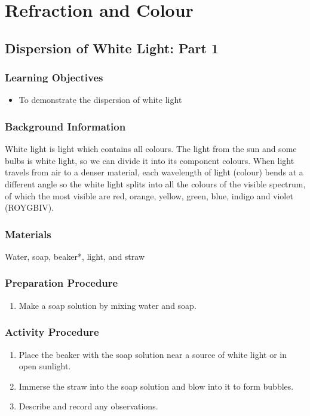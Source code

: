 \section{Refraction and Colour}

\subsection{Dispersion of White Light: Part 1}

\subsubsection*{Learning Objectives}
\begin{itemize}
\item{To demonstrate the dispersion of white light} 
\end{itemize}

\subsubsection*{Background Information}
White light is light which contains all colours.  The light from the sun and some bulbs is white light, so we can divide it into its component colours.  When light travels from air to a denser material, each wavelength of light (colour) bends at a different angle so the white light splits into all the colours of the visible spectrum, of which the most visible are red, orange, yellow, green, blue, indigo and violet (ROYGBIV).

\subsubsection*{Materials}
Water, soap, beaker*, light, and straw

\subsubsection*{Preparation Procedure}
\begin{enumerate}
\item{Make a soap solution by mixing water and soap.} 
\end{enumerate}

\subsubsection*{Activity Procedure}
\begin{enumerate}
\item{Place the beaker with the soap solution near a source of white light or in open sunlight.} 
\item{Immerse the straw into the soap solution and blow into it to form bubbles.} 
\item{Describe and record any observations.} 
\end{enumerate}

